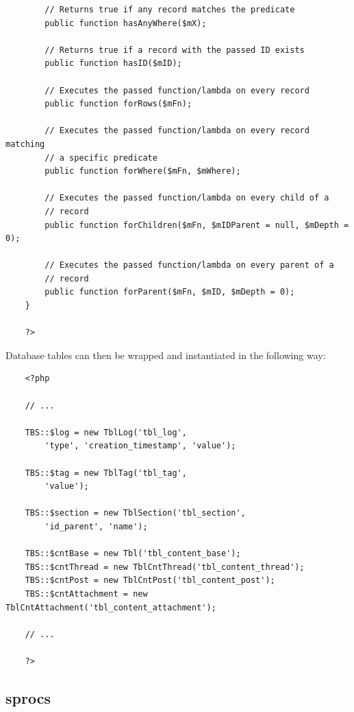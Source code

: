 \documentclass[12pt]{report}
\begin{document}
\begin{verbatim}
        // Returns true if any record matches the predicate
        public function hasAnyWhere($mX);

        // Returns true if a record with the passed ID exists
        public function hasID($mID);

        // Executes the passed function/lambda on every record
        public function forRows($mFn);

        // Executes the passed function/lambda on every record matching
        // a specific predicate
        public function forWhere($mFn, $mWhere);

        // Executes the passed function/lambda on every child of a
        // record
        public function forChildren($mFn, $mIDParent = null, $mDepth = 0);

        // Executes the passed function/lambda on every parent of a
        // record
        public function forParent($mFn, $mID, $mDepth = 0);
    }

    ?>
                    \end{verbatim}                

                    Database tables can then be wrapped and instantiated in the following way:

                    \begin{verbatim}
    <?php

    // ...

    TBS::$log = new TblLog('tbl_log',
        'type', 'creation_timestamp', 'value');

    TBS::$tag = new TblTag('tbl_tag',
        'value');

    TBS::$section = new TblSection('tbl_section',
        'id_parent', 'name');

    TBS::$cntBase = new Tbl('tbl_content_base');
    TBS::$cntThread = new TblCntThread('tbl_content_thread');
    TBS::$cntPost = new TblCntPost('tbl_content_post');
    TBS::$cntAttachment = new TblCntAttachment('tbl_content_attachment');

    // ...

    ?>
                    \end{verbatim}              
                
                \subsection{sprocs}
\end{document}
